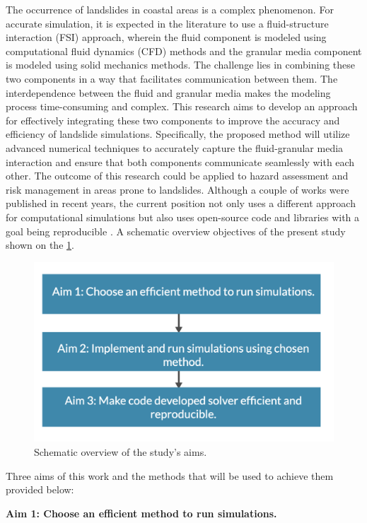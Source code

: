 The occurrence of landslides in coastal areas is a complex phenomenon. For accurate simulation, it is expected in the literature to use a fluid-structure interaction (FSI) \cite{belytschko1980fsi} approach, wherein the fluid component is modeled using computational fluid dynamics (CFD) methods and the granular media component is modeled using solid mechanics methods. The challenge lies in combining these two components in a way that facilitates communication between them. The interdependence between the fluid and granular media makes the modeling process time-consuming and complex. This research aims to develop an approach for effectively integrating these two components to improve the accuracy and efficiency of landslide simulations. Specifically, the proposed method will utilize advanced numerical techniques to accurately capture the fluid-granular media interaction and ensure that both components communicate seamlessly with each other. The outcome of this research could be applied to hazard assessment and risk management in areas prone to landslides. Although a couple of works were published in recent years, the current position not only uses a different approach for computational simulations but also uses open-source code and libraries with a goal being reproducible \cite{NAS2019}. A schematic overview objectives of the present study shown on the \ref{fig:aims}.

\begin{figure}[!ht]
    \centering
    \includegraphics[width=12cm]{GWU_Thesis_Sarmakeeva/Images/chap1/Aims.png}
    \caption{Schematic overview of the study's aims.}
    \label{fig:aims}
\end{figure}
Three aims of this work and the methods that will be used to achieve them provided below:

\textbf{Aim 1: Choose an efficient method to run simulations.}

